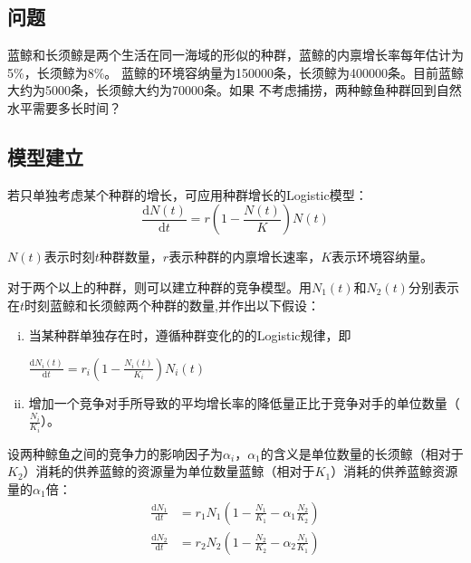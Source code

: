 \documentclass[UTF8]{ctexart}
\begin{document}
    \subsection{问题}
    蓝鲸和长须鲸是两个生活在同一海域的形似的种群，蓝鲸的内禀增长率每年估计为5\%，长须鲸为8\%。
    蓝鲸的环境容纳量为150000条，长须鲸为400000条。目前蓝鲸大约为5000条，长须鲸大约为70000条。如果
    不考虑捕捞，两种鲸鱼种群回到自然水平需要多长时间？
    \subsection{模型建立}
    若只单独考虑某个种群的增长，可应用种群增长的Logistic模型：
    \begin{equation}
        \frac{\mathrm{d} N(t)}{\mathrm{d} t}=r(1-\frac{N(t)}{K})N(t)
    \end{equation}
    \par $N(t)$表示时刻$t$种群数量，$r$表示种群的内禀增长速率，$K$表示环境容纳量。
    \par 对于两个以上的种群，则可以建立种群的竞争模型。用$N_1(t)$和$N_2(t)$分别表示在$t$时刻蓝鲸和长须鲸两个种群的数量,并作出以下假设：
    \begin{enumerate}[(i)]
        \item 当某种群单独存在时，遵循种群变化的的Logistic规律，即\\
        
        \begin{center} $ \frac{\mathrm{d} N_i(t)}{\mathrm{d} t}=r_i(1-\frac{N_i(t)}{K_i})N_i(t)$ \end{center}
        \item 增加一个竞争对手所导致的平均增长率的降低量正比于竞争对手的单位数量（$\frac{N_i}{K_i}$）。
    \end{enumerate}  
    \par 设两种鲸鱼之间的竞争力的影响因子为$\alpha _i$，$\alpha _1$的含义是单位数量的长须鲸（相对于$K_2$）消耗的供养蓝鲸的资源量为单位数量蓝鲸（相对于$K_1$）消耗的供养蓝鲸资源量的$\alpha _1$倍：
    \begin{align}
        \frac{\mathrm{d} N_1}{\mathrm{d} t} &=r_1N_1(1-\frac{N_1}{K_1}-\alpha_1 \frac{N_2}{K_2}) \\
        \frac{\mathrm{d} N_2}{\mathrm{d} t} &=r_2N_2(1-\frac{N_2}{K_2}-\alpha_2 \frac{N_1}{K_1})
    \end{align}
\end{document}

